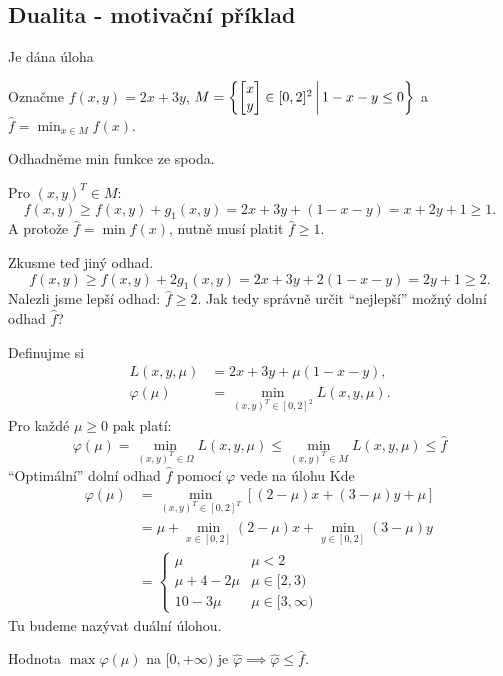 \subsection{Dualita - motivační příklad}
Je dána úloha

Označme $f(x,y) = 2x + 3y$,
$
    M = \left\lbrace 
    \begin{bmatrix}
        x \\
        y
    \end{bmatrix} \in [0,2]^2 \, \middle| \, 1 - x - y \leq 0 \right\rbrace
$
a $\hat f = \min_{x\in M} f(x)$.

Odhadněme min funkce ze spoda. 

Pro $(x, y)^T \in M$: \[f(x, y) \geq f(x,y) + g_1(x,y) = 2x + 3y + (1-x-y) = x+2y+1 \geq 1.\]
A protože $\hat f = \min f(x)$, nutně musí platit $\hat f \geq 1$.

Zkusme teď jiný odhad.
\[f(x, y) \geq f(x,y) + 2g_1(x,y) = 2x + 3y + 2(1-x-y) = 2y + 1 \geq 2.\]
Nalezli jsme lepší odhad: $\hat f \geq 2$. Jak tedy správně určit \enquote{nejlepší} možný dolní odhad $\hat f$?

Definujme si
\begin{align*}
    L(x, y, \mu) &= 2x + 3y + \mu(1-x-y), \\
    \varphi(\mu) &= \min_{(x, y)^T \in [0,2]^2}L(x, y, \mu).
\end{align*}
Pro každé $\mu \geq 0$ pak platí:
\[
    \varphi(\mu) = \min_{(x, y)^T \in \Omega}L(x, y, \mu) \leq \min_{(x, y)^T \in M}L(x, y, \mu) \leq \hat f
\]
\enquote{Optimální} dolní odhad $\hat f$ pomocí $\varphi$ vede na úlohu
Kde
\begin{align*}
    \varphi(\mu) &= \min_{(x, y)^T \in [0,2]^T} \left[(2-\mu)x + (3-\mu)y + \mu\right] \\
    &= \mu + \min_{x \in [0,2]}(2-\mu)x + \min_{y \in [0,2]}(3-\mu)y \\
    &= 
    \begin{cases}
        \mu & \mu < 2 \\
        \mu + 4 - 2\mu & \mu \in [2, 3) \\
        10 - 3\mu & \mu \in [3, \infty)
    \end{cases}
\end{align*}
Tu budeme nazývat duální úlohou.

Hodnota $\max \varphi(\mu)$ na $[0, +\infty)$ je $\hat \varphi \implies \hat \varphi \leq \hat f$.

